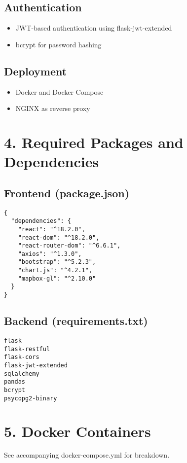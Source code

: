 \documentclass[12pt]{article}
\begin{document}
\subsection*{Authentication}
\begin{itemize}
    \item JWT-based authentication using flask-jwt-extended
    \item bcrypt for password hashing
\end{itemize}

\subsection*{Deployment}
\begin{itemize}
    \item Docker and Docker Compose
    \item NGINX as reverse proxy
\end{itemize}

\section*{4. Required Packages and Dependencies}

\subsection*{Frontend (package.json)}
\begin{lstlisting}
{
  "dependencies": {
    "react": "^18.2.0",
    "react-dom": "^18.2.0",
    "react-router-dom": "^6.6.1",
    "axios": "^1.3.0",
    "bootstrap": "^5.2.3",
    "chart.js": "^4.2.1",
    "mapbox-gl": "^2.10.0"
  }
}
\end{lstlisting}

\subsection*{Backend (requirements.txt)}
\begin{lstlisting}
flask
flask-restful
flask-cors
flask-jwt-extended
sqlalchemy
pandas
bcrypt
psycopg2-binary
\end{lstlisting}

\section*{5. Docker Containers}
See accompanying docker-compose.yml for breakdown.
\end{document}
